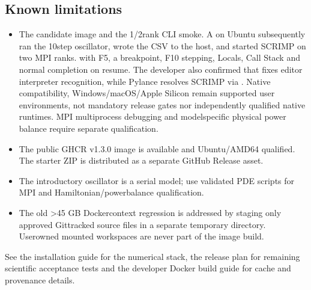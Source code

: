 \documentclass[letterpaper,10pt,english]{sphinxmanual}
\begin{document}
\subsection{Known limitations}
\label{\detokenize{vscode:known-limitations}}\begin{itemize}
\item {} 
\sphinxAtStartPar
The candidate image  and the
1/2\sphinxhyphen{}rank CLI smoke. A  on
Ubuntu subsequently ran the 10\sphinxhyphen{}step oscillator, wrote the CSV
to the host, and started SCRIMP on two MPI ranks.
 with F5,
a breakpoint, F10 stepping, Locals, Call Stack and normal
completion on resume. The developer also confirmed that
 fixes editor
interpreter recognition, while Pylance resolves SCRIMP via
. Native compatibility,
Windows/macOS/Apple Silicon remain  supported
user environments, not mandatory release gates nor independently
qualified native runtimes. MPI multi\sphinxhyphen{}process debugging and
model\sphinxhyphen{}specific physical power balance require separate qualification.

\item {} 
\sphinxAtStartPar
The public GHCR v1.3.0 image is available and Ubuntu/AMD64 qualified.
The starter ZIP is distributed as a separate GitHub Release asset.

\item {} 
\sphinxAtStartPar
The introductory oscillator is a serial model; use validated
PDE scripts for MPI and Hamiltonian/power\sphinxhyphen{}balance qualification.

\item {} 
\sphinxAtStartPar
The old \textgreater{}45 GB Docker\sphinxhyphen{}context regression is addressed by staging
only approved Git\sphinxhyphen{}tracked source files in a separate temporary
directory. User\sphinxhyphen{}owned mounted workspaces are never part of the
image build.

\end{itemize}

\sphinxAtStartPar
See the installation guide for the numerical stack, the release
plan for remaining scientific acceptance tests and the developer
Docker build guide for cache and provenance details.
\end{document}
